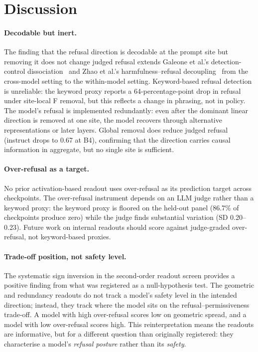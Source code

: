 \documentclass[11pt,letterpaper]{article}
\begin{document}
\section{Discussion}
\label{sec:discussion}

\paragraph{Decodable but inert.}
The finding that the refusal direction is decodable at the prompt site but removing it does not change judged refusal extends Galeone et al.'s detection-control dissociation~\citep{Galeone2026} and Zhao et al.'s harmfulness--refusal decoupling~\citep{Zhao2025} from the cross-model setting to the within-model setting. Keyword-based refusal detection is unreliable: the keyword proxy reports a 64-percentage-point drop in refusal under site-local F removal, but this reflects a change in phrasing, not in policy. The model's refusal is implemented redundantly: even after the dominant linear direction is removed at one site, the model recovers through alternative representations or later layers. Global removal does reduce judged refusal (instruct drops to 0.67 at B4), confirming that the direction carries causal information in aggregate, but no single site is sufficient.

\paragraph{Over-refusal as a target.}
No prior activation-based readout uses over-refusal as its prediction target across checkpoints. The over-refusal instrument depends on an LLM judge rather than a keyword proxy: the keyword proxy is floored on the held-out panel (86.7\% of checkpoints produce zero) while the judge finds substantial variation (SD 0.20--0.23). Future work on internal readouts should score against judge-graded over-refusal, not keyword-based proxies.

\paragraph{Trade-off position, not safety level.}
The systematic sign inversion in the second-order readout screen provides a positive finding from what was registered as a null-hypothesis test. The geometric and redundancy readouts do not track a model's safety level in the intended direction; instead, they track where the model sits on the refusal--permissiveness trade-off. A model with high over-refusal scores low on geometric spread, and a model with low over-refusal scores high. This reinterpretation means the readouts are informative, but for a different question than originally registered: they characterise a model's \emph{refusal posture} rather than its \emph{safety}.
\end{document}
